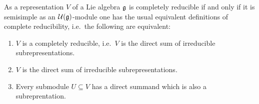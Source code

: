\begin{rem}
 As a representation $V$ of a Lie algebra $\mathfrak{g}$ is completely reducible if and only if it is semisimple as an $\mathcal{U}(\mathfrak{g})$-module one has the usual equivalent definitions of complete reducibility, i.e.\ the following are equivalent:
 \begin{enumerate}
  \item
   $V$ is a completely reducible, i.e.\ $V$ is the direct sum of irreducible subrepresentations.
  \item
   $V$ is the direct sum of irreducible subrepresentations.
  \item
   Every submodule $U \subseteq V$ has a direct summand which is also a subreprentation.
 \end{enumerate}
\end{rem}


















